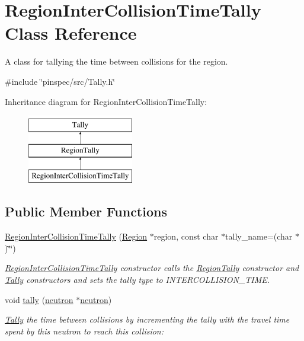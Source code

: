 \hypertarget{classRegionInterCollisionTimeTally}{\section{Region\-Inter\-Collision\-Time\-Tally Class Reference}
\label{classRegionInterCollisionTimeTally}
}


A class for tallying the time between collisions for the region.  




{\ttfamily \#include \char`\"{}pinspec/src/\-Tally.\-h\char`\"{}}

Inheritance diagram for Region\-Inter\-Collision\-Time\-Tally\-:\begin{figure}[H]
\begin{center}
\leavevmode
\includegraphics[height=3.000000cm]{classRegionInterCollisionTimeTally}
\end{center}
\end{figure}
\subsection*{Public Member Functions}
\begin{DoxyCompactItemize}
\item 
\hyperlink{classRegionInterCollisionTimeTally_ac80f657141e0c7388092e41f25e228f1}{Region\-Inter\-Collision\-Time\-Tally} (\hyperlink{classRegion}{Region} $\ast$region, const char $\ast$tally\-\_\-name=(char $\ast$)\char`\"{}\char`\"{})
\begin{DoxyCompactList}\small\item\em \hyperlink{classRegionInterCollisionTimeTally}{Region\-Inter\-Collision\-Time\-Tally} constructor calls the \hyperlink{classRegionTally}{Region\-Tally} constructor and \hyperlink{classTally}{Tally} constructors and sets the tally type to I\-N\-T\-E\-R\-C\-O\-L\-L\-I\-S\-I\-O\-N\-\_\-\-T\-I\-M\-E. \end{DoxyCompactList}\item 
void \hyperlink{classRegionInterCollisionTimeTally_a389dd158a3a10b959fa444d12a8cb752}{tally} (\hyperlink{structneutron}{neutron} $\ast$\hyperlink{structneutron}{neutron})
\begin{DoxyCompactList}\small\item\em \hyperlink{classTally}{Tally} the time between collisions by incrementing the tally with the travel time spent by this neutron to reach this collision\-: \end{DoxyCompactList}\end{DoxyCompactItemize}
